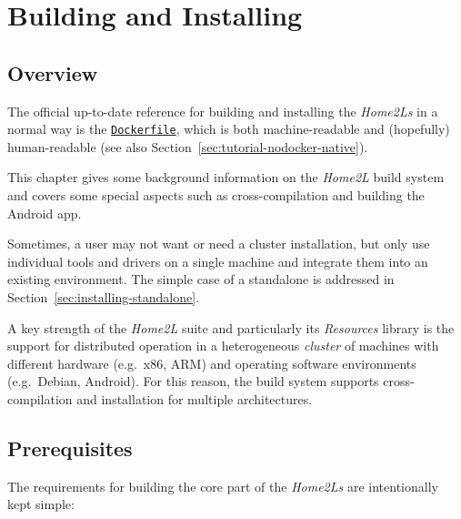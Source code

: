 \documentclass[12pt,english,parskip=half,headheight=19pt]{scrreprt}
\newcommand{\refsrc}[1]{\href{#1}{\texttt{#1}}}     %
\begin{document}
%
\chapter{Building and Installing}
\label{ch:installing}
%




\section{Overview}
\label{sec:installing-intro}


The official up-to-date reference for building and installing the \textit{Home2Ls} in a normal way is the \refsrc{Dockerfile}, which is both machine-readable and (hopefully) human-readable (see also Section~\ref{sec:tutorial-nodocker-native}).

This chapter gives some background information on the \textit{Home2L} build system and covers some special aspects such as cross-compilation and building the Android app.

Sometimes, a user may not want or need a cluster installation, but only use individual tools and drivers on a single machine and integrate them into an existing environment. The simple case of a standalone is addressed in Section~\ref{sec:installing-standalone}.

A key strength of the \textit{Home2L} suite and particularly its \textit{Resources} library is the support for distributed operation in a heterogeneous \textit{cluster} of machines with different hardware (e.g.~x86, ARM) and operating software environments (e.g.~Debian, Android). For this reason, the build system supports cross-compilation and installation for multiple architectures.





\section{Prerequisites}
\label{sec:installing-prerequisites}


The requirements for building the core part of the \textit{Home2Ls} are intentionally kept simple:
\end{document}
